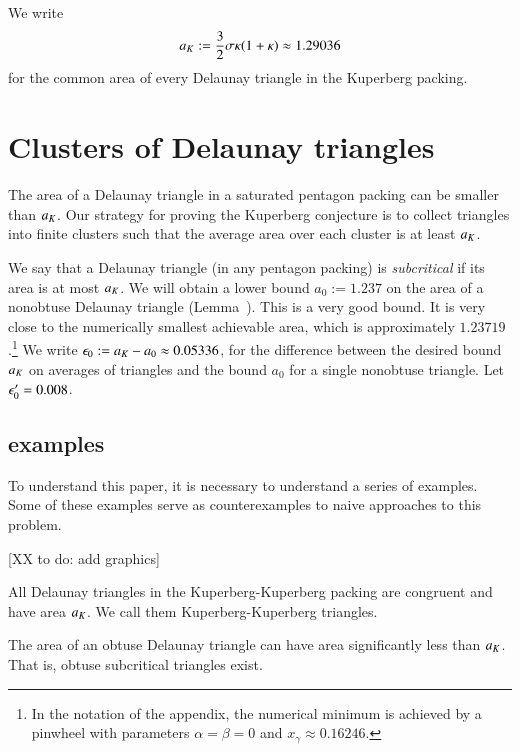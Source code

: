 We write 
\[
a_K := \frac{3}{2}{ \sigma \kappa(1+\kappa)} \approx 1.29036
\] %
for the common area of every Delaunay triangle in the 
Kuperberg packing.  

\section{Clusters of Delaunay triangles}

The area of a Delaunay triangle in a saturated pentagon packing can be
smaller than $a_K$.  Our strategy for proving the Kuperberg conjecture
is to collect triangles into finite clusters such that the average
area over each cluster is at least $a_K$.  

We say that a Delaunay triangle (in any pentagon packing) is {\it
  subcritical} if its area is at most $a_K$.  We will obtain a lower
bound $a_0 := 1.237$ on the area of a nonobtuse Delaunay triangle
(Lemma~).  This is a very good bound.  It is very close
to the numerically smallest achievable area, which is approximately
$1.23719$.\footnote{In the notation of the appendix, the numerical 
minimum is achieved by a pinwheel with parameters $\alpha=\beta=0$
and $x_\gamma\approx 0.16246$.}  
We write $\epsilon_0 := a_K - a_0 \approx 0.05336$, for the
difference between the desired bound $a_K$ on averages of triangles
and the bound $a_0$ for a single nonobtuse triangle.
Let $\epsilon_0' = 0.008$.  

\subsection{examples}

To understand this paper, it is necessary to understand a series of examples.
Some of these examples serve as counterexamples to naive approaches to this problem.

[XX to do: add graphics]

\begin{example} All Delaunay triangles in the Kuperberg-Kuperberg packing are congruent and have
area $a_K$.
We call them Kuperberg-Kuperberg triangles.
\end{example}

\begin{example}  The area of an obtuse Delaunay triangle can have area
significantly less than $a_K$.  That is, obtuse subcritical triangles exist.
\end{example}

